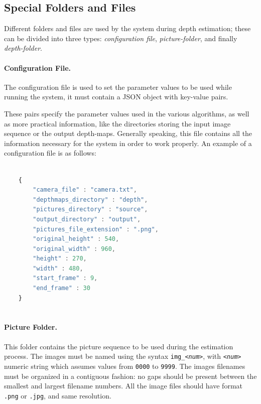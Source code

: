 \documentclass[notitlepage,english]{hgbreport}
\begin{document}
\subsection{Special Folders and Files}
Different folders and files are used by the system during depth estimation; these can be divided into three types: \emph{configuration file}, \emph{picture-folder}, and finally \emph{depth-folder}.

\paragraph{Configuration File.} The configuration file is used to set the parameter values to be used while running the system, it must contain a JSON object with key-value pairs.

These pairs specify the parameter values used in the various algorithms, as well as more practical information, like the directories storing the input image sequence or the output depth-maps. Generally speaking, this file contains all the information necessary for the system in order to work properly.
An example of a configuration file is as follows:
\begin{lstlisting}[stepnumber=0, language=JavaScript]

	{
		"camera_file" : "camera.txt",
		"depthmaps_directory" : "depth",
		"pictures_directory" : "source",
		"output_directory" : "output",
		"pictures_file_extension" : ".png",
		"original_height" : 540,
		"original_width" : 960,
		"height" : 270,
		"width" : 480,
		"start_frame" : 9,
		"end_frame" : 30
	}
	
\end{lstlisting}


\paragraph{Picture Folder.} This folder contains the picture sequence to be used during the estimation process.
The images must be named using the syntax \texttt{img\_\textit{<num>}}, with \texttt{\textit{<num>}} numeric string which assumes values from \texttt{0000} to \texttt{9999}. The images filenames must be organized in a contiguous fashion: no gaps should be present between the smallest and largest filename numbers.
All the image files should have format \texttt{.png} or \texttt{.jpg}, and same resolution.
\end{document}
